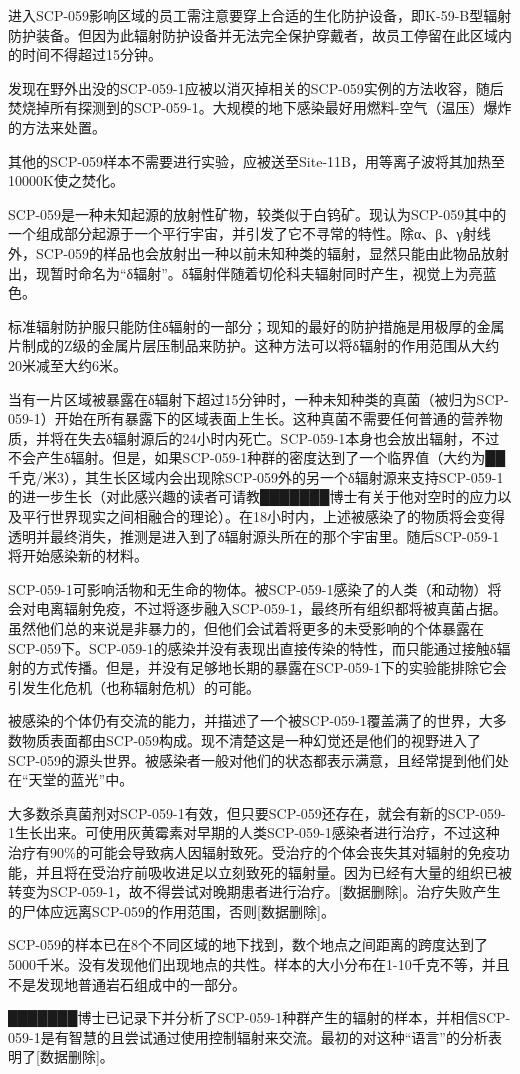 进入SCP-059影响区域的员工需注意要穿上合适的生化防护设备，即K-59-B型辐射防护装备。但因为此辐射防护设备并无法完全保护穿戴者，故员工停留在此区域内的时间不得超过15分钟。

发现在野外出没的SCP-059-1应被以消灭掉相关的SCP-059实例的方法收容，随后焚烧掉所有探测到的SCP-059-1。大规模的地下感染最好用燃料-空气（温压）爆炸的方法来处置。

其他的SCP-059样本不需要进行实验，应被送至Site-11B，用等离子波将其加热至10000K使之焚化。

SCP-059是一种未知起源的放射性矿物，较类似于白钨矿。现认为SCP-059其中的一个组成部分起源于一个平行宇宙，并引发了它不寻常的特性。除α、β、γ射线外，SCP-059的样品也会放射出一种以前未知种类的辐射，显然只能由此物品放射出，现暂时命名为“δ辐射”。δ辐射伴随着切伦科夫辐射同时产生，视觉上为亮蓝色。

标准辐射防护服只能防住δ辐射的一部分；现知的最好的防护措施是用极厚的金属片制成的Z级的金属片层压制品来防护。这种方法可以将δ辐射的作用范围从大约20米减至大约6米。

当有一片区域被暴露在δ辐射下超过15分钟时，一种未知种类的真菌（被归为SCP-059-1）开始在所有暴露下的区域表面上生长。这种真菌不需要任何普通的营养物质，并将在失去δ辐射源后的24小时内死亡。SCP-059-1本身也会放出辐射，不过不会产生δ辐射。但是，如果SCP-059-1种群的密度达到了一个临界值（大约为██千克\slash 米3），其生长区域内会出现除SCP-059外的另一个δ辐射源来支持SCP-059-1的进一步生长（对此感兴趣的读者可请教███████博士有关于他对空时的应力以及平行世界现实之间相融合的理论）。在18小时内，上述被感染了的物质将会变得透明并最终消失，推测是进入到了δ辐射源头所在的那个宇宙里。随后SCP-059-1将开始感染新的材料。

SCP-059-1可影响活物和无生命的物体。被SCP-059-1感染了的人类（和动物）将会对电离辐射免疫，不过将逐步融入SCP-059-1，最终所有组织都将被真菌占据。虽然他们总的来说是非暴力的，但他们会试着将更多的未受影响的个体暴露在SCP-059下。SCP-059-1的感染并没有表现出直接传染的特性，而只能通过接触δ辐射的方式传播。但是，并没有足够地长期的暴露在SCP-059-1下的实验能排除它会引发生化危机（也称辐射危机）的可能。

被感染的个体仍有交流的能力，并描述了一个被SCP-059-1覆盖满了的世界，大多数物质表面都由SCP-059构成。现不清楚这是一种幻觉还是他们的视野进入了SCP-059的源头世界。被感染者一般对他们的状态都表示满意，且经常提到他们处在“天堂的蓝光”中。

大多数杀真菌剂对SCP-059-1有效，但只要SCP-059还存在，就会有新的SCP-059-1生长出来。可使用灰黄霉素对早期的人类SCP-059-1感染者进行治疗，不过这种治疗有90\%的可能会导致病人因辐射致死。受治疗的个体会丧失其对辐射的免疫功能，并且将在受治疗前吸收进足以立刻致死的辐射量。因为已经有大量的组织已被转变为SCP-059-1，故不得尝试对晚期患者进行治疗。{[}数据删除]。治疗失败产生的尸体应远离SCP-059的作用范围，否则{[}数据删除]。

SCP-059的样本已在8个不同区域的地下找到，数个地点之间距离的跨度达到了5000千米。没有发现他们出现地点的共性。样本的大小分布在1-10千克不等，并且不是发现地普通岩石组成中的一部分。

███████博士已记录下并分析了SCP-059-1种群产生的辐射的样本，并相信SCP-059-1是有智慧的且尝试通过使用控制辐射来交流。最初的对这种“语言”的分析表明了{[}数据删除]。
